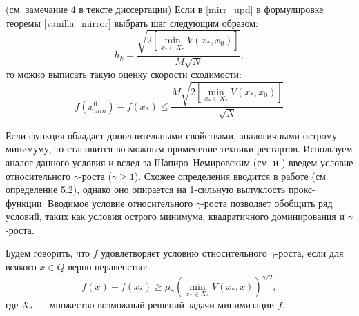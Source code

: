 \begin{remark} (см. замечание 4 в тексте диссертации)
    Если в \eqref{mirr_upd} в формулировке теоремы \ref{vanilla_mirror} выбрать шаг следующим образом:
    \begin{equation} \label{mirr_step}
        h_{k} = \frac{\sqrt{2 \left[\min\limits_{x_* \in X_*}{V(x_*, x_0)}\right] }}{M\sqrt{N}},
    \end{equation}
    то можно выписать такую оценку скорости сходимости:
    \begin{equation} \label{mirr_est}
        f(x_{min}^0) - f(x_*) \leq \frac{M\sqrt{2 \left[\min\limits_{x_* \in X_*}{V(x_*, x_0)}\right]}}{\sqrt{N}}
    \end{equation}
\end{remark}

Если функция обладает дополнительными свойствами, аналогичными острому минимуму,  то становится возможным применение техники рестартов. Используем аналог данного условия и вслед за Шапиро–Немировским (см. \cite{shapiro_2005} и \cite{shapiro_2021} ) введем условие относительного $\gamma$-роста ($\gamma \geq 1$). Схожее определения вводится в работе \cite{sharp_rest} (см. определение 5.2), однако оно опирается на 1-сильную выпуклость прокс-функции. Вводимое условие относительного $\gamma$-роста позволяет обобщить ряд условий, таких как условия острого минимума, квадратичного доминирования и $\gamma$-роста. 
\begin{definition}
   Будем говорить, что $f$ удовлетворяет условию относительного $\gamma$-роста, если для всякого $x \in Q$ верно неравенство:
   \begin{equation} \label{gamma-growth}
       f(x) - f(x_*) \geq \mu_{\gamma}\left(\min_{x_* \in X_*}{V(x_*,x)}\right)^{\gamma/2},
   \end{equation}
   где $X_*$ --- множество возможный решений задачи минимизации $f$. 
\end{definition}

